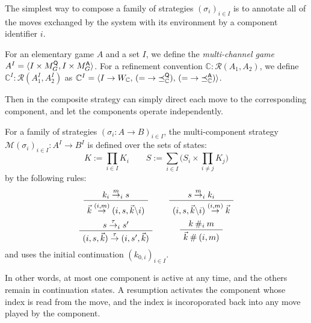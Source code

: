 The simplest way to compose a family of strategies $(\sigma_i)_{i\in I}$
is to annotate all of the moves exchanged by the system with its environment
by a component identifier $i$.

\begin{definition}
For an elementary game $A$ and a set $I$,
we define the \emph{multi-channel game}
$A^I = \langle I \times M_G^{ \mathsf{Q} }, I \times M_G^{ \mathsf{A} } \rangle$.
For a refinement convention
$\mathbb{C} : \mathcal{R}(A_1, A_2)$,
we define
$\mathbb{C}^I : \mathcal{R}(A_1^I, A_2^I)$
as
$\mathbb{C}^I = \langle I \rightarrow W_\mathbb{C}, \,
                        ({=} \rightarrow {\preceq}_\mathbb{C}^{ \mathsf{Q} }), \,
                        ({=} \rightarrow {\preceq}_\mathbb{C}^{ \mathsf{A} }) \rangle$.
\end{definition}

Then in the composite strategy can simply direct each move
to the corresponding component,
and let the components operate independently.

\begin{definition}
For a family of strategies $(\sigma_i : A \rightarrow B)_{i \in I}$,
the multi-component strategy
$\mathcal{M}(\sigma_i)_{i \in I} : A^I \rightarrow B^I$
is defined over the sets of states:
\[
  K := \prod_{i \in I} K_i \qquad
  S := \sum_{i \in I}
    \Big( S_i \times \prod_{i \ne j} K_j \Big)
\]
by the following rules:
\[
  \begin{array}{c@{\qquad}c}
    \AxiomC{$k_i \stackrel{m}{\rightarrow}_i s$}
    \UnaryInfC{$\vec{k} \stackrel{(i, m)}{\rightarrow} (i, s, \vec{k} \backslash i)$}
    \DisplayProof
    &
    \AxiomC{$s \stackrel{m}{\rightarrow}_i k_i$}
    \UnaryInfC{$(i, s, \vec{k} \backslash i) \stackrel{(i, m)}{\rightarrow} \vec{k}$}
    \DisplayProof
    \\[1.5em]
    \AxiomC{$s \stackrel{\tau}{\rightarrow}_i s'$}
    \UnaryInfC{$(i, s, \vec{k}) \stackrel{\tau}{\rightarrow} (i, s', \vec{k})$}
    \DisplayProof
    &
    \AxiomC{$k \: \#_i \: m$}
    \UnaryInfC{$\vec{k} \: \# \: (i, m)$}
    \DisplayProof
  \end{array}
\]
and uses the initial continuation $(k_{0,i})_{i \in I}$.
\end{definition}

In other words,
at most one component is active at any time,
and the others remain in continuation states.
A resumption activates the component whose index
is read from the move,
and the index is incoroporated back into
any move played by the component.

